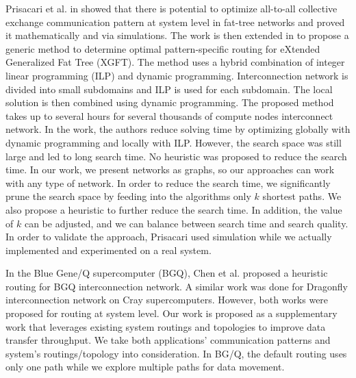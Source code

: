 Prisacari et al. in \cite{Prisacari13a} showed that there is potential to optimize all-to-all collective exchange communication pattern at system level in fat-tree networks and proved it mathematically and via simulations. The work is then extended in \cite{Prisacari13b} to propose a generic method to determine optimal pattern-specific routing for eXtended Generalized Fat Tree (XGFT). The method uses a hybrid combination of integer linear programming (ILP) and dynamic programming. Interconnection network is divided into small subdomains and ILP is used for each subdomain. The local solution is then combined using dynamic programming. The proposed method takes up to several hours for several thousands of compute nodes interconnect network. In the work, the authors reduce solving time by optimizing globally with dynamic programming and locally with ILP. However, the search space was still large and led to long search time. No heuristic was proposed to reduce the search time. In our work, we present networks as graphs, so our approaches can work with any type of network. In order to reduce the search time, we significantly prune the search space by feeding into the algorithms only $k$ shortest paths. We also propose a heuristic to further reduce the search time. In addition, the value of $k$ can be adjusted, and we can balance between search time and search quality. In order to validate the approach, Prisacari used simulation while we actually implemented and experimented on a real system. %

In the Blue Gene/Q supercomputer (BGQ), Chen et al. \cite{Chen:BGQ} proposed a heuristic routing for BGQ interconnection network. A similar \cite{garcia2013:CrayDragonfly} work was done for Dragonfly interconnection network on Cray supercomputers. However, both works were proposed for routing at system level. Our work is proposed as a supplementary work that leverages existing system routings and topologies to improve data transfer throughput. We take both applications' communication patterns and system's routings/topology into consideration. In BG/Q, the default routing uses only one path while we explore multiple paths for data movement. 


